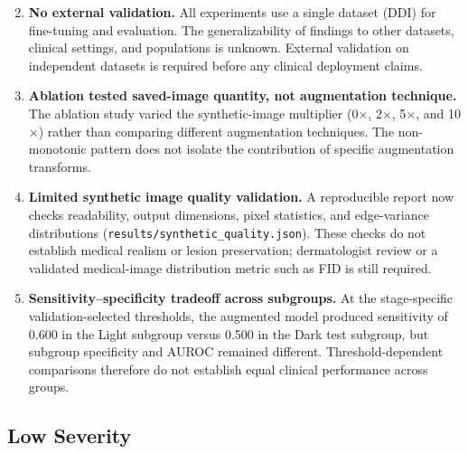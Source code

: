 \begin{enumerate}
    \setcounter{enumi}{1}
    \item \textbf{No external validation.} All experiments use a single dataset (DDI) for fine-tuning and evaluation. The generalizability of findings to other datasets, clinical settings, and populations is unknown. External validation on independent datasets is required before any clinical deployment claims.

    \item \textbf{Ablation tested saved-image quantity, not augmentation technique.} The ablation study varied the synthetic-image multiplier (0$\times$, 2$\times$, 5$\times$, and 10$\times$) rather than comparing different augmentation techniques. The non-monotonic pattern does not isolate the contribution of specific augmentation transforms.

    \item \textbf{Limited synthetic image quality validation.} A reproducible report now checks readability, output dimensions, pixel statistics, and edge-variance distributions (\texttt{results/synthetic\_quality.json}). These checks do not establish medical realism or lesion preservation; dermatologist review or a validated medical-image distribution metric such as FID is still required.

    \item \textbf{Sensitivity--specificity tradeoff across subgroups.} At the stage-specific validation-selected thresholds, the augmented model produced sensitivity of 0.600 in the Light subgroup versus 0.500 in the Dark test subgroup, but subgroup specificity and AUROC remained different. Threshold-dependent comparisons therefore do not establish equal clinical performance across groups.
\end{enumerate}

\subsection{Low Severity}

